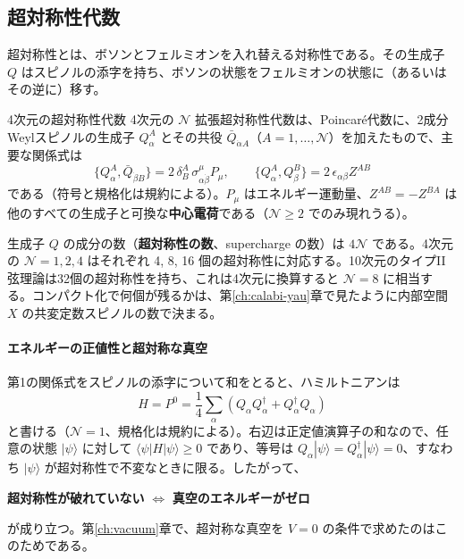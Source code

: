 \documentclass[uplatex, dvipdfmx, book]{jsbook}
\let\origsubsection\subsection
\let\origsubsubsection\subsubsection
\renewcommand{\section}{\origsubsection}
\renewcommand{\subsection}{\origsubsubsection}
\renewcommand{\subsubsection}{\paragraph}
\begin{document}
\section{超対称性代数}

超対称性とは、ボソンとフェルミオンを入れ替える対称性である。その生成子 $Q$ はスピノルの添字を持ち、ボソンの状態をフェルミオンの状態に（あるいはその逆に）移す。

\begin{mydef}{4次元の超対称性代数}{}
4次元の $\mathcal{N}$ 拡張超対称性代数は、Poincar\'e代数に、2成分Weylスピノルの生成子 $Q^A_\alpha$ とその共役 $\bar{Q}_{\dot\alpha A}$（$A = 1, \dots, \mathcal{N}$）を加えたもので、主要な関係式は
\begin{equation*}
    \{ Q^A_\alpha, \bar{Q}_{\dot\beta B} \} = 2\,\delta^A_B\, \sigma^\mu_{\alpha\dot\beta} P_\mu, \qquad
    \{ Q^A_\alpha, Q^B_\beta \} = 2\,\epsilon_{\alpha\beta} Z^{AB}
\end{equation*}
である（符号と規格化は規約による）。$P_\mu$ はエネルギー運動量、$Z^{AB} = -Z^{BA}$ は他のすべての生成子と可換な\textbf{中心電荷}である（$\mathcal{N} \ge 2$ でのみ現れうる）。
\end{mydef}

生成子 $Q$ の成分の数（\textbf{超対称性の数}、supercharge の数）は $4\mathcal{N}$ である。4次元の $\mathcal{N} = 1, 2, 4$ はそれぞれ 4, 8, 16 個の超対称性に対応する。10次元のタイプII弦理論は32個の超対称性を持ち、これは4次元に換算すると $\mathcal{N} = 8$ に相当する。コンパクト化で何個が残るかは、第\ref{ch:calabi-yau}章で見たように内部空間 $X$ の共変定数スピノルの数で決まる。

\paragraph{エネルギーの正値性と超対称な真空}
第1の関係式をスピノルの添字について和をとると、ハミルトニアンは
\begin{equation}
    H = P^0 = \frac{1}{4}\sum_{\alpha} \left( Q_\alpha Q_\alpha^\dagger + Q_\alpha^\dagger Q_\alpha \right)
\end{equation}
と書ける（$\mathcal{N} = 1$、規格化は規約による）。右辺は正定値演算子の和なので、任意の状態 $|\psi\rangle$ に対して $\langle\psi|H|\psi\rangle \ge 0$ であり、等号は $Q_\alpha|\psi\rangle = Q^\dagger_\alpha|\psi\rangle = 0$、すなわち $|\psi\rangle$ が超対称性で不変なときに限る。したがって、
\begin{center}
    \textbf{超対称性が破れていない} $\iff$ \textbf{真空のエネルギーがゼロ}
\end{center}
が成り立つ。第\ref{ch:vacuum}章で、超対称な真空を $V = 0$ の条件で求めたのはこのためである。
\end{document}
